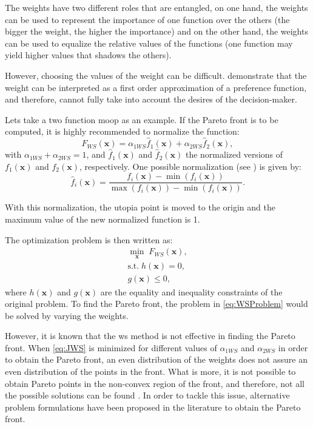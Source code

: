 The weights have two different roles that are entangled, on one hand, the weights can be used to represent the importance of one function over the others (the bigger the weight, the higher the importance) and on the other hand, the weights can be used to equalize the relative values of the functions (one function may yield higher values that shadows the others).

However, choosing the values of the weight can be difficult. \citet{Marler2010} demonstrate that the weight can be interpreted as a first order approximation of a preference function, and therefore, cannot fully take into account the desires of the decision-maker.

Lets take a two function \gls{moop} as an example. If the Pareto front is to be computed, it is highly recommended to normalize the function:
\begin{equation}
F_{WS}(\mathbf{x}) = \alpha_{1WS} \hat{f}_{1}(\mathbf{x}) + \alpha_{2WS} \hat{f}_{2}(\mathbf{x}),
\label{eq:JWS}
\end{equation}
with $\alpha_{1WS} + \alpha_{2WS}=1$, and $\hat{f}_{1}(\mathbf{x})$ and $\hat{f}_{2}(\mathbf{x})$ the normalized versions of $f_{1}(\mathbf{x})$ and $f_{2}(\mathbf{x})$, respectively. One possible normalization (see \citet{Marler2004}) is given by:
\begin{equation}
\hat{f}_{i}(\mathbf{x}) = \frac{f_{i}(\mathbf{x})-\min{\left( f_{i}(\mathbf{x})\right) }}{\max{(f_{i}(\mathbf{x}))}-\min{\left( f_{i}(\mathbf{x})\right) }}.
\label{eq:NormalizedJ}
\end{equation}

With this normalization, the utopia point is moved to the origin and the maximum value of the new normalized function is 1.

The optimization problem is then written as:
\begin{equation}
\begin{gathered}
\min_{\mathbf{x}}{\; F_{WS}(\mathbf{x})}, \\
\text{s.t.} \; h(\mathbf{x})=0, \\
g(\mathbf{x}) \leq 0,
\end{gathered}
\label{eq:WSProblem}
\end{equation}
%
where $h(\mathbf{x})$ and $g(\mathbf{x})$ are the equality and inequality constraints of the original problem. To find the Pareto front, the problem in \eqref{eq:WSProblem} would be solved by varying the weights.

However, it is known that the \gls{ws} method is not effective in finding the Pareto front. When \eqref{eq:JWS} is minimized for different values of $\alpha_{1WS}$ and $\alpha_{2WS}$ in order to obtain the Pareto front, an even distribution of the weights does not assure an even distribution of the points in the front. What is more, it is not possible to obtain Pareto points in the non-convex region of the front, and therefore, not all the possible solutions can be found \citep{Das1997}. In order to tackle this issue, alternative problem formulations have been proposed in the literature to obtain the Pareto front.
